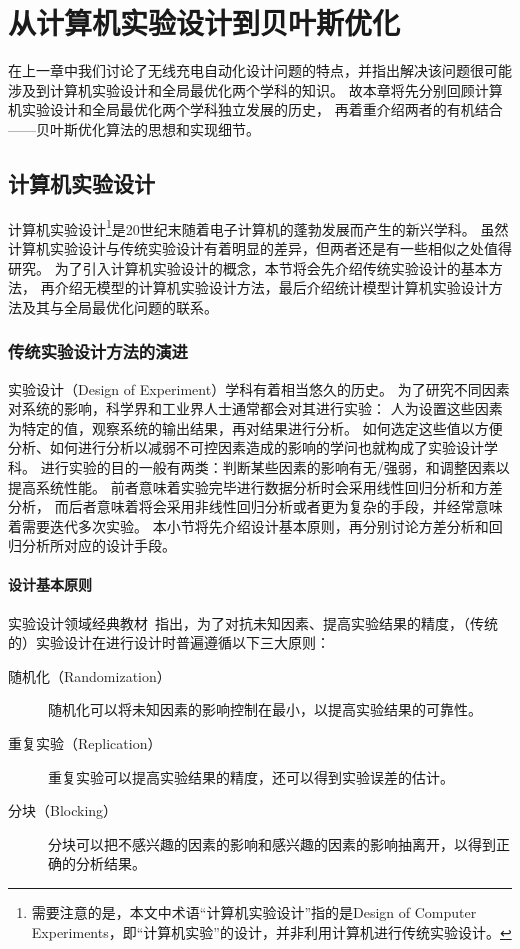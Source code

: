 \documentclass[index]{subfiles}
\begin{document}
\chapter{从计算机实验设计到贝叶斯优化}\label{sec:doebgo}
在上一章中我们讨论了无线充电自动化设计问题的特点，并指出解决该问题很可能涉及到计算机实验设计和全局最优化两个学科的知识。
故本章将先分别回顾计算机实验设计和全局最优化两个学科独立发展的历史，
再着重介绍两者的有机结合——贝叶斯优化算法的思想和实现细节。

\section{计算机实验设计}\label{sec:doe}
计算机实验设计\footnote{需要注意的是，本文中术语“计算机实验设计”指的是Design of Computer Experiments，即“计算机实验”的设计，并非利用计算机进行传统实验设计。}是20世纪末随着电子计算机的蓬勃发展而产生的新兴学科\cite{mckay1979}。
虽然计算机实验设计与传统实验设计有着明显的差异，但两者还是有一些相似之处值得研究。
为了引入计算机实验设计的概念，本节将会先介绍传统实验设计的基本方法，
再介绍无模型的计算机实验设计方法，最后介绍统计模型计算机实验设计方法及其与全局最优化问题的联系。

\subsection{传统实验设计方法的演进}
实验设计（Design of Experiment）学科有着相当悠久的历史。
为了研究不同因素对系统的影响，科学界和工业界人士通常都会对其进行实验：
人为设置这些因素为特定的值，观察系统的输出结果，再对结果进行分析。
如何选定这些值以方便分析、如何进行分析以减弱不可控因素造成的影响的学问也就构成了实验设计学科\cite{davies1954}。
进行实验的目的一般有两类：判断某些因素的影响有无/强弱，和调整因素以提高系统性能。
前者意味着实验完毕进行数据分析时会采用线性回归分析和方差分析，
而后者意味着将会采用非线性回归分析或者更为复杂的手段，并经常意味着需要迭代多次实验。
本小节将先介绍设计基本原则，再分别讨论方差分析和回归分析所对应的设计手段。

\subsubsection{设计基本原则}
实验设计领域经典教材~指出，为了对抗未知因素、提高实验结果的精度，（传统的）实验设计在进行设计时普遍遵循以下三大原则：
\begin{description}
  \item[随机化（Randomization）] 随机化可以将未知因素的影响控制在最小，以提高实验结果的可靠性。
  \item[重复实验（Replication）] 重复实验可以提高实验结果的精度，还可以得到实验误差的估计。
  \item[分块（Blocking）] 分块可以把不感兴趣的因素的影响和感兴趣的因素的影响抽离开，以得到正确的分析结果。
\end{description}
\end{document}
